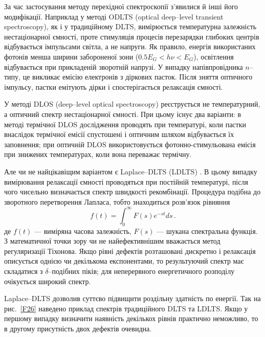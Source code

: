 \documentclass[10pt,a5paper,titlepage,oneside]{book}
\numberwithin{equation}{part}
\begin{document}
За час застосування методу перехідної спектроскопії з'явилися й інші його модифікації.
Наприклад у методі ODLTS (optical deep--level transient spectroscopy), як і у традиційному DLTS,
вимірюється температурна залежність нестаціонарної ємності, проте стимуляція
процесів перезарядки глибоких центрів відбувається імпульсами світла, а не напруги.
Як правило, енергія використаних фотонів менша ширини забороненої
зони ($0.5E_G<h\nu<E_G$),
освітлення відбувається при прикладеній зворотній напрузі.
У випадку напівпровідника $n$--типу, це викликає емісію електронів
з діркових пасток.
Після зняття оптичного імпульсу, пастки емітують дірки і спостерігається релаксація ємності.

У методі DLOS (deep--level optical spectroscopy) реєструється не температурний, а оптичний спектр нестаціонарної ємності.
При цьому існує два варіанти:
в методі термічної DLOS дослідження проводять при температурі, коли пастки внаслідок термічної емісії спустошені
і оптичним шляхом відбувається їх заповнення;
при оптичній DLOS використовується фотонно-стимульована емісія при знижених температурах,
коли вона переважає термічну.

Але чи не найцікавіщим варіантом є Laplace--DLTS (LDLTS) \cite{LDLTS2}.
В цьому випадку вимірювання релаксації ємності проводяться при постійній температурі,
після чого чисельно визначається спектр швидкості рекомбінації.
Процедура  подібна до зворотного перетворення Лапласа,
тобто знаходиться розв'язок рівняння
\begin{equation}
\label{DLTSLapl}
f(t)=\int_0^\infty F(s) e^{-st}ds\,.
\end{equation}
де
$f(t)$ --- виміряна часова залежність,
$F(s)$ --- шукана спектральна функція.
З математичної точки зору чи не найефективнішим вважається
метод регуляризації Тіхонова.
Якщо рівні дефектів розташовані дискретно і релаксація описується
однією чи декількома експонентами, то результуючий спектр
має складатися з $\delta$--подібних піків;
для неперервного енергетичного розподілу очікується широкий спектр.

Laplace--DLTS дозволив суттєво підвищити роздільну здатність по енергії.
Так на рис.~\ref{F26} наведено приклад спектрів традиційного DLTS та LDLTS.
Якщо у першому випадку визначити наявність декількох рівнів
практично неможливо, то в другому присутність двох дефектів очевидна.
\end{document}
